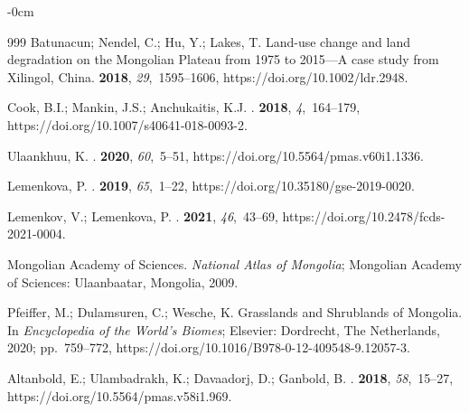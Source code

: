 \documentclass[geosciences,article,accept,pdftex,oneauthor]{Definitions/mdpi}
\begin{document}
\begin{adjustwidth}{-\extralength}{0cm}
\begin{thebibliography}{999}
Batunacun; Nendel, C.; Hu, Y.; Lakes, T.
\newblock Land-use change and land degradation on the Mongolian Plateau from
  1975 to 2015—A case study from Xilingol, China.
 {\bf 2018}, {\em
  29},~1595--1606, https://doi.org/10.1002/ldr.2948.

Cook, B.I.; Mankin, J.S.; Anchukaitis, K.J.
.
 {\bf 2018}, {\em 4},~164--179, https://doi.org/10.1007/s40641-018-0093-2.

Ulaankhuu, K.
.
 {\bf 2020},
  {\em 60},~5–51, https://doi.org/10.5564/pmas.v60i1.1336.

Lemenkova, P.
.
 {\bf 2019}, {\em 65},~1--22, https://doi.org/10.35180/gse-2019-0020.

Lemenkov, V.; Lemenkova, P.
.
 {\bf 2021}, {\em
  46},~43--69, https://doi.org/10.2478/fcds-2021-0004.

{Mongolian Academy of Sciences}.
\newblock \emph{National Atlas of Mongolia}; Mongolian Academy of Sciences: Ulaanbaatar, Mongolia, 2009.


Pfeiffer, M.; Dulamsuren, C.; Wesche, K. {Grasslands and Shrublands of
  Mongolia}.
\newblock In {\em {Encyclopedia of the World's Biomes}}; Elsevier: Dordrecht,
 The Netherlands,  2020; pp.~759--772, https://doi.org/10.1016/B978-0-12-409548-9.12057-3.

Altanbold, E.; Ulambadrakh, K.; Davaadorj, D.; Ganbold, B.
.
 {\bf 2018},
  {\em 58},~15--27, https://doi.org/10.5564/pmas.v58i1.969.


\end{thebibliography}
\end{adjustwidth}
\end{document}
